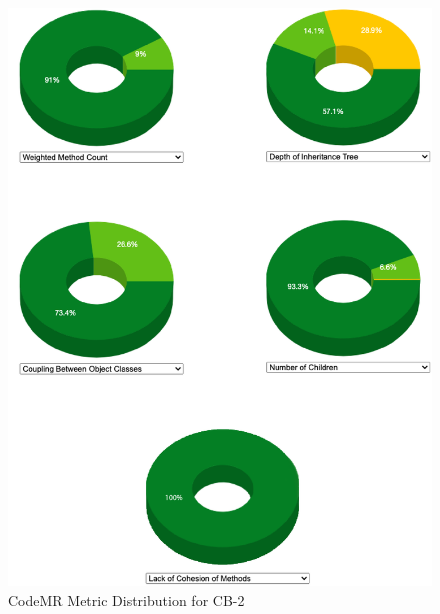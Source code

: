 \begin{figure}[ht!]
    \centering
    \includegraphics[scale=1]{figures/CB-2-donuts.png}
    \caption{CodeMR Metric Distribution for CB-2}
    \label{fig:CB-2-donuts}
\end{figure}
\FloatBarrier

